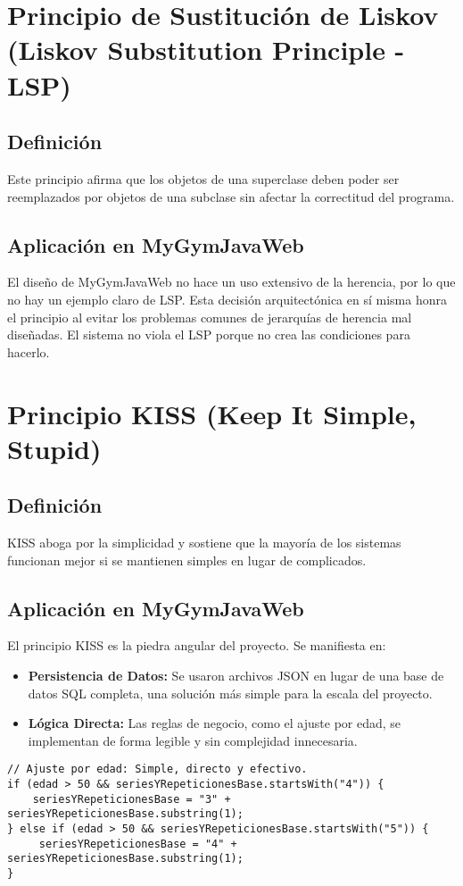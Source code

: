 \documentclass[11pt,a4paper]{article}
\begin{document}
\section{Principio de Sustitución de Liskov (Liskov Substitution Principle - LSP)}
\subsection{Definición}
Este principio afirma que los objetos de una superclase deben poder ser reemplazados por objetos de una subclase sin afectar la correctitud del programa.
\subsection{Aplicación en MyGymJavaWeb}
El diseño de MyGymJavaWeb no hace un uso extensivo de la herencia, por lo que no hay un ejemplo claro de LSP. Esta decisión arquitectónica en sí misma honra el principio al evitar los problemas comunes de jerarquías de herencia mal diseñadas. El sistema no viola el LSP porque no crea las condiciones para hacerlo.

\section{Principio KISS (Keep It Simple, Stupid)}
\subsection{Definición}
KISS aboga por la simplicidad y sostiene que la mayoría de los sistemas funcionan mejor si se mantienen simples en lugar de complicados.
\subsection{Aplicación en MyGymJavaWeb}
El principio KISS es la piedra angular del proyecto. Se manifiesta en:
\begin{itemize}
    \item \textbf{Persistencia de Datos:} Se usaron archivos JSON en lugar de una base de datos SQL completa, una solución más simple para la escala del proyecto.
    \item \textbf{Lógica Directa:} Las reglas de negocio, como el ajuste por edad, se implementan de forma legible y sin complejidad innecesaria.
\end{itemize}
\begin{lstlisting}[caption={Lógica KISS para el ajuste por edad en \texttt{GenerarRutinaServlet.java}}]
// Ajuste por edad: Simple, directo y efectivo.
if (edad > 50 && seriesYRepeticionesBase.startsWith("4")) {
    seriesYRepeticionesBase = "3" + seriesYRepeticionesBase.substring(1);
} else if (edad > 50 && seriesYRepeticionesBase.startsWith("5")) {
     seriesYRepeticionesBase = "4" + seriesYRepeticionesBase.substring(1);
}
\end{lstlisting}
\end{document}
